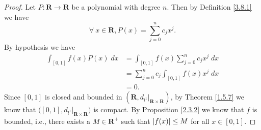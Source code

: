 \begin{proof}
    Let \(P : \mathbf{R} \to \mathbf{R}\) be a polynomial with degree \(n\).
    Then by Definition \ref{3.8.1} we have
    \[
        \forall\ x \in \mathbf{R}, P(x) = \sum_{j = 0}^n c_j x^j.
    \]
    By hypothesis we have
    \begin{align*}
        \int_{[0, 1]} f(x) P(x) \; dx & = \int_{[0, 1]} f(x) \sum_{j = 0}^n c_j x^j \; dx \\
                                      & = \sum_{j = 0}^n c_j \int_{[0, 1]} f(x) x^j \; dx \\
                                      & = 0.
    \end{align*}
    Since \([0, 1]\) is closed and bounded in \((\mathbf{R}, d_{l^1}|_{\mathbf{R} \times \mathbf{R}})\), by Theorem \ref{1.5.7} we know that \(\big([0, 1], d_{l^1}|_{\mathbf{R} \times \mathbf{R}}\big)\) is compact.
    By Proposition \ref{2.3.2} we know that \(f\) is bounded, i.e., there exists a \(M \in \mathbf{R}^+\) such that \(\abs*{f(x)} \leq M\) for all \(x \in [0, 1]\).


\end{proof}
